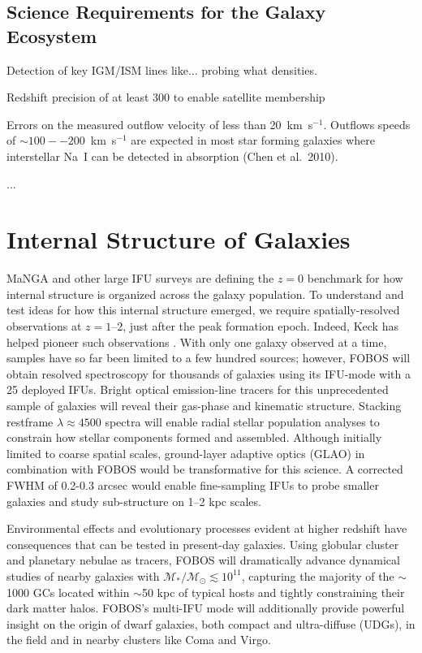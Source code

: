 \documentclass[11pt,a4paper,twoside,onecolumn,openany,final,oldfontcommands]{memoir}
\begin{document}
\subsection{Science Requirements for the Galaxy Ecosystem}

\begin{sciencerequirement}

\reqitem Detection of key IGM/ISM lines like... probing what densities.

\reqitem Redshift precision of at least 300 \kms{} to enable satellite membership

\reqitem Errors on the measured outflow velocity of less than 20~km~s$^{-1}$.  Outflows speeds of $\sim100 -- 200$~km~s$^{-1}$ are expected in most star forming galaxies where interstellar Na~I can be detected in absorption (Chen et al.~2010). 

\reqitem ...

\end{sciencerequirement}


\section{Internal Structure of Galaxies}
\label{sci:internal}

MaNGA \citep{bundy15} and other large IFU surveys are defining the $z=0$ benchmark for how internal structure is organized across the galaxy population. To understand and test ideas for how this internal structure emerged, we require spatially-resolved observations at $z = 1$--2, just after the peak formation epoch. Indeed, Keck has helped pioneer such observations \citep[e.g.,][]{erb04, miller11,law09}. With only one galaxy observed at a time, samples have so far been limited to a few hundred sources; however, FOBOS will obtain resolved spectroscopy for thousands of galaxies using its IFU-mode with a 25 deployed IFUs. Bright optical emission-line tracers for this unprecedented sample of galaxies will reveal their gas-phase and kinematic structure. Stacking restframe $\lambda \approx 4500$ spectra will enable radial stellar population analyses to constrain how stellar components formed and assembled. Although initially limited to coarse spatial scales, ground-layer adaptive optics (GLAO) in combination with FOBOS would be transformative for this science. A corrected FWHM of 0.2-0.3 arcsec would enable fine-sampling IFUs to probe smaller galaxies and study sub-structure on 1--2 kpc scales.

Environmental effects and evolutionary processes evident at higher redshift have consequences that can be tested in present-day galaxies.  Using globular cluster and planetary nebulae as tracers, FOBOS will dramatically advance dynamical studies of nearby galaxies with $\mathcal{M_\ast/M_\odot} \lesssim 10^{11}$, capturing the majority of the $\sim$1000 GCs located within $\sim$50 kpc of typical hosts \citep[see][]{2013ApJ...772...82H} and tightly constraining their dark matter halos. FOBOS's multi-IFU mode will additionally provide powerful insight on the origin of dwarf galaxies, both compact and ultra-diffuse (UDGs), in the field and in nearby clusters like Coma and Virgo.
\end{document}
